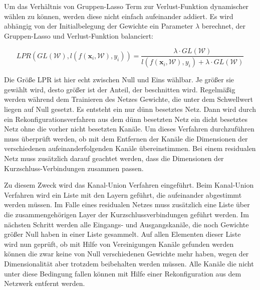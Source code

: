 Um das Verhältnis von Gruppen-Lasso Term zur Verlust-Funktion dynamischer wählen zu können, werden diese nicht einfach aufeinander addiert. Es wird abhängig von der Initialbelegung der Gewichte ein Parameter $\lambda$  berechnet, der Gruppen-Lasso und Verlust-Funktion balanciert:

\begin{equation}
 LPR\left(GL(\mathcal{W}),l(f(\mathbf{x}_i,\mathcal{W}),y_i)\right) = \frac{\lambda \cdot GL(\mathcal{W})}{l(f(\mathbf{x}_i,\mathcal{W}), y_i) + \lambda \cdot GL(\mathcal{W})}           
\end{equation}

Die Größe LPR ist hier echt zwischen Null und Eins wählbar. Je größer sie gewählt wird, desto größer ist der Anteil, der beschnitten wird. Regelmäßig werden während dem Trainieren des Netzes Gewichte, die unter dem Schwellwert liegen auf Null gesetzt. Es entsteht ein nur dünn besetztes Netz. Dann wird durch ein Rekonfigurationsverfahren aus dem dünn besetzten Netz ein dicht besetztes Netz ohne die vorher nicht besetzten Kanäle. Um dieses Verfahren durchzuführen muss überprüft werden, ob mit dem Entfernen der Kanäle die Dimensionen der verschiedenen aufeinanderfolgenden Kanäle übereinstimmen. Bei einem residualen Netz muss zusätzlich darauf geachtet werden, dass die Dimensionen der Kurzschluss-Verbindungen zusammen passen.


Zu diesem Zweck wird das Kanal-Union Verfahren eingeführt. Beim Kanal-Union Verfahren wird ein Liste mit den Layern geführt, die aufeinander abgestimmt werden müssen. Im Falle eines residualen Netzes muss zusätzlich eine Liste über die zusammengehörigen Layer der Kurzschlussverbindungen geführt werden. Im nächsten Schritt werden alle Eingangs- und Ausgangskanäle, die noch Gewichte größer Null haben in einer Liste gesammelt. Auf allen Elementen dieser Liste wird nun geprüft, ob mit Hilfe von Vereinigungen Kanäle gefunden werden können die zwar keine von Null verschiedenen Gewichte mehr haben, wegen der Dimensionalität aber trotzdem beibehalten werden müssen. Alle Kanäle die nicht unter diese Bedingung fallen können mit Hilfe einer Rekonfiguration aus dem Netzwerk entfernt werden. 

